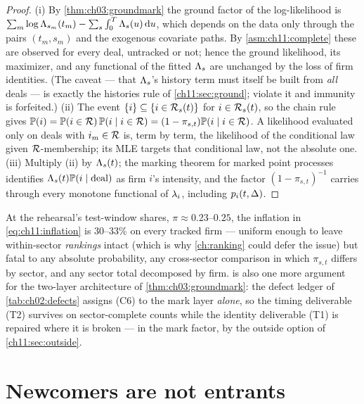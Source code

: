 \begin{proof}
(i) By \cref{thm:ch03:groundmark} the ground factor of the log-likelihood
is $\sum_m \log \Lambda_{s_m}(t_m) - \sum_s \int_0^{T} \Lambda_s(u)\,\mathrm{d} u$,
which depends on the data only through the pairs $(t_m, s_m)$ and the
exogenous covariate paths. By \cref{asm:ch11:complete} these are observed
for every deal, untracked or not; hence the ground likelihood, its
maximizer, and any functional of the fitted $\Lambda_s$ are unchanged by the
loss of firm identities. (The caveat --- that $\Lambda_s$'s history term must
itself be built from \emph{all} deals --- is exactly the histories rule of
\cref{ch11:sec:ground}; violate it and immunity is forfeited.)
(ii) The event $\{i\} \subseteq \{i \in \mathcal{R}_s(t)\}$ for
$i \in \mathcal{R}_s(t)$, so the chain rule gives
$\mathbb{P}(i) = \mathbb{P}(i \in \mathcal{R})\,\mathbb{P}(i \mid i \in \mathcal{R})
= (1-\pi_{s,t}) \mathbb{P}(i \mid i \in \mathcal{R})$. A likelihood evaluated only
on deals with $i_m \in \mathcal{R}$ is, term by term, the likelihood of the
conditional law given $\mathcal{R}$-membership; its MLE targets that
conditional law, not the absolute one.
(iii) Multiply (ii) by $\Lambda_s(t)$; the marking theorem for marked point
processes \citep[Ch.~6]{daley2003} identifies
$\Lambda_s(t)\mathbb{P}(i\mid\mathrm{deal})$ as firm $i$'s intensity, and the
factor $(1-\pi_{s,t})^{-1}$ carries through every monotone functional of
$\lambda_i$, including $p_i(t,\Delta)$.
\end{proof}

At the rehearsal's test-window shares, $\pi \approx 0.23$--$0.25$, the
inflation in \cref{eq:ch11:inflation} is $30$--$33\%$ on every tracked
firm --- uniform enough to leave within-sector \emph{rankings} intact
(which is why \cref{ch:ranking} could defer the issue) but fatal to any
absolute probability, any cross-sector comparison in which $\pi_{s,t}$
differs by sector, and any sector total decomposed by firm.
 is also one more argument for the two-layer
architecture of \cref{thm:ch03:groundmark}: the defect ledger of
\cref{tab:ch02:defects} assigns (C6) to the mark layer \emph{alone},
so the timing deliverable (T2) survives on sector-complete counts while
the identity deliverable (T1) is repaired where it is broken --- in the
mark factor, by the outside option of \cref{ch11:sec:outside}.

\section{Newcomers are not entrants}\label{ch11:sec:newcomer}

